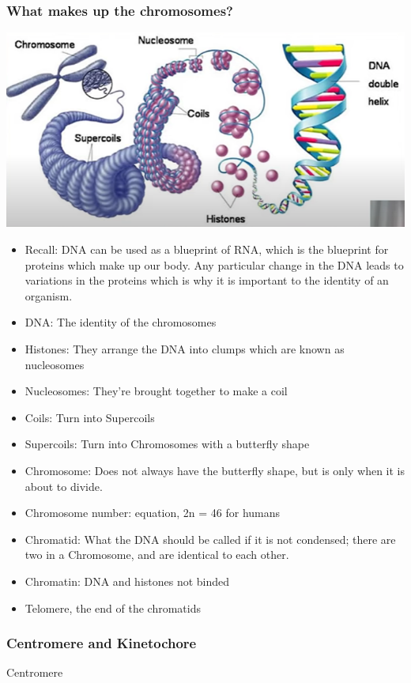 \documentclass{article}
\begin{document}
\subsubsection*{What makes up the chromosomes?}
\includegraphics[scale=1]{dns.png}
\begin{itemize}
    \item Recall: DNA can be used as a blueprint of RNA, which is the blueprint for proteins which make up our body. Any particular change in the DNA leads to variations in the proteins which is why it is important to the identity of an organism.
    \item DNA: The identity of the chromosomes
    \item Histones: They arrange the DNA into clumps which are known as nucleosomes
    \item Nucleosomes: They're brought together to make a coil
    \item Coils: Turn into Supercoils
    \item Supercoils: Turn into Chromosomes with a butterfly shape
    \item Chromosome: Does not always have the butterfly shape, but is only when it is about to divide.
    \item Chromosome number: equation, 2n = 46 for humans
    \item Chromatid: What the DNA should be called if it is not condensed; there are two in a Chromosome, and are identical to each other.
    \item Chromatin: DNA and histones not binded
    \item Telomere, the end of the chromatids
\end{itemize}
\subsubsection*{Centromere and Kinetochore}
Centromere
\end{document}
